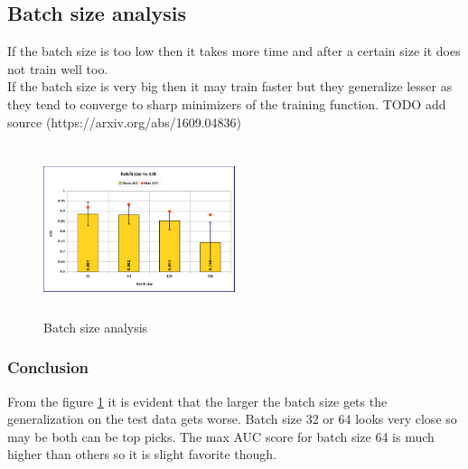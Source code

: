 \flushbottom
\newpage

\subsection{Batch size analysis}
If the batch size is too low then it takes more time and after a certain size it does not train well too.\\
If the batch size is very big then it may train faster but they generalize lesser as they tend to converge to sharp minimizers of the training function.
TODO add source (https://arxiv.org/abs/1609.04836) 
\begin{figure}[ht]
\centering
\includegraphics[height=5cm,width=0.5\textwidth]{images/densenet/batch_size}
\caption{Batch size analysis}
\label{fig:batch_size}
\end{figure}

\subsubsection{Conclusion}
From the figure \ref{fig:batch_size} it is evident that the larger the batch size gets the generalization on the test data gets worse. Batch size 32 or 64 looks very close so may be both can be top picks.
The max AUC score for batch size 64 is much higher than others so it is slight favorite though. 


